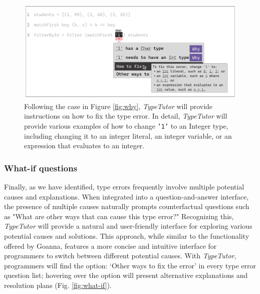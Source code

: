 \begin{figure}[hbt]
  \includegraphics[width=\linewidth]{How}
  \caption[An example of \textit{TypeTutor} providing change suggestion (`how' questions)]{
    \label{fig:how}
    Following the case in Figure \ref{fig:why}, \textit{TypeTutor} will provide instructions on how to fix the type error. In detail,  \textit{TypeTutor} will provide various examples of how to change \texttt{'1'} to an Integer type, including changing it to an integer literal, an integer variable, or an expression that evaluates to an integer.
    }
\end{figure}

\subsubsection{What-if questions}
Finally, as we have identified, type errors frequently involve multiple potential causes and explanations. When integrated into a question-and-answer interface, the presence of multiple causes naturally prompts counterfactual questions such as "What are other ways that can cause this type error?" Recognizing this, \textit{TypeTutor} will provide a natural and user-friendly interface for exploring various potential causes and solutions. This approach, while similar to the functionality offered by Goanna, features a more concise and intuitive interface for programmers to switch between different potential causes. With \textit{TypeTutor}, programmers will find the option: `Other ways to fix the error' in every type error question list; hovering over the option will present alternative explanations and resolution plans (Fig. \ref{fig:what-if}).

